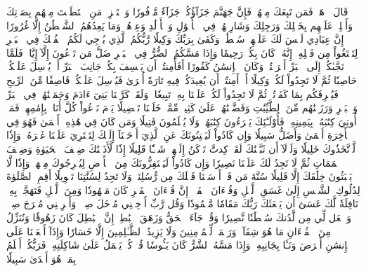 قَالَ ٱذۡهَبۡ فَمَن تَبِعَكَ مِنۡهُمۡ فَإِنَّ جَهَنَّمَ جَزَآؤُكُمۡ جَزَآءٗ مَّوۡفُورٗا
وَٱسۡتَفۡزِزۡ مَنِ ٱسۡتَطَعۡتَ مِنۡهُم بِصَوۡتِكَ وَأَجۡلِبۡ عَلَيۡهِم بِخَيۡلِكَ وَرَجِلِكَ وَشَارِكۡهُمۡ فِي ٱلۡأَمۡوَٰلِ وَٱلۡأَوۡلَٰدِ وَعِدۡهُمۡۚ وَمَا يَعِدُهُمُ ٱلشَّيۡطَٰنُ إِلَّا غُرُورًا
إِنَّ عِبَادِي لَيۡسَ لَكَ عَلَيۡهِمۡ سُلۡطَٰنٞۚ وَكَفَىٰ بِرَبِّكَ وَكِيلٗا
رَّبُّكُمُ ٱلَّذِي يُزۡجِي لَكُمُ ٱلۡفُلۡكَ فِي ٱلۡبَحۡرِ لِتَبۡتَغُواْ مِن فَضۡلِهِۦٓۚ إِنَّهُۥ كَانَ بِكُمۡ رَحِيمٗا
وَإِذَا مَسَّكُمُ ٱلضُّرُّ فِي ٱلۡبَحۡرِ ضَلَّ مَن تَدۡعُونَ إِلَّآ إِيَّاهُۖ فَلَمَّا نَجَّىٰكُمۡ إِلَى ٱلۡبَرِّ أَعۡرَضۡتُمۡۚ وَكَانَ ٱلۡإِنسَٰنُ كَفُورًا
أَفَأَمِنتُمۡ أَن يَخۡسِفَ بِكُمۡ جَانِبَ ٱلۡبَرِّ أَوۡ يُرۡسِلَ عَلَيۡكُمۡ حَاصِبٗا ثُمَّ لَا تَجِدُواْ لَكُمۡ وَكِيلًا
أَمۡ أَمِنتُمۡ أَن يُعِيدَكُمۡ فِيهِ تَارَةً أُخۡرَىٰ فَيُرۡسِلَ عَلَيۡكُمۡ قَاصِفٗا مِّنَ ٱلرِّيحِ فَيُغۡرِقَكُم بِمَا كَفَرۡتُمۡ ثُمَّ لَا تَجِدُواْ لَكُمۡ عَلَيۡنَا بِهِۦ تَبِيعٗا
۞وَلَقَدۡ كَرَّمۡنَا بَنِيٓ ءَادَمَ وَحَمَلۡنَٰهُمۡ فِي ٱلۡبَرِّ وَٱلۡبَحۡرِ وَرَزَقۡنَٰهُم مِّنَ ٱلطَّيِّبَٰتِ وَفَضَّلۡنَٰهُمۡ عَلَىٰ كَثِيرٖ مِّمَّنۡ خَلَقۡنَا تَفۡضِيلٗا
يَوۡمَ نَدۡعُواْ كُلَّ أُنَاسِۭ بِإِمَٰمِهِمۡۖ فَمَنۡ أُوتِيَ كِتَٰبَهُۥ بِيَمِينِهِۦ فَأُوْلَـٰٓئِكَ يَقۡرَءُونَ كِتَٰبَهُمۡ وَلَا يُظۡلَمُونَ فَتِيلٗا
وَمَن كَانَ فِي هَٰذِهِۦٓ أَعۡمَىٰ فَهُوَ فِي ٱلۡأٓخِرَةِ أَعۡمَىٰ وَأَضَلُّ سَبِيلٗا
وَإِن كَادُواْ لَيَفۡتِنُونَكَ عَنِ ٱلَّذِيٓ أَوۡحَيۡنَآ إِلَيۡكَ لِتَفۡتَرِيَ عَلَيۡنَا غَيۡرَهُۥۖ وَإِذٗا لَّٱتَّخَذُوكَ خَلِيلٗا
وَلَوۡلَآ أَن ثَبَّتۡنَٰكَ لَقَدۡ كِدتَّ تَرۡكَنُ إِلَيۡهِمۡ شَيۡـٔٗا قَلِيلًا
إِذٗا لَّأَذَقۡنَٰكَ ضِعۡفَ ٱلۡحَيَوٰةِ وَضِعۡفَ ٱلۡمَمَاتِ ثُمَّ لَا تَجِدُ لَكَ عَلَيۡنَا نَصِيرٗا
وَإِن كَادُواْ لَيَسۡتَفِزُّونَكَ مِنَ ٱلۡأَرۡضِ لِيُخۡرِجُوكَ مِنۡهَاۖ وَإِذٗا لَّا يَلۡبَثُونَ خِلَٰفَكَ إِلَّا قَلِيلٗا
سُنَّةَ مَن قَدۡ أَرۡسَلۡنَا قَبۡلَكَ مِن رُّسُلِنَاۖ وَلَا تَجِدُ لِسُنَّتِنَا تَحۡوِيلًا
أَقِمِ ٱلصَّلَوٰةَ لِدُلُوكِ ٱلشَّمۡسِ إِلَىٰ غَسَقِ ٱلَّيۡلِ وَقُرۡءَانَ ٱلۡفَجۡرِۖ إِنَّ قُرۡءَانَ ٱلۡفَجۡرِ كَانَ مَشۡهُودٗا
وَمِنَ ٱلَّيۡلِ فَتَهَجَّدۡ بِهِۦ نَافِلَةٗ لَّكَ عَسَىٰٓ أَن يَبۡعَثَكَ رَبُّكَ مَقَامٗا مَّحۡمُودٗا
وَقُل رَّبِّ أَدۡخِلۡنِي مُدۡخَلَ صِدۡقٖ وَأَخۡرِجۡنِي مُخۡرَجَ صِدۡقٖ وَٱجۡعَل لِّي مِن لَّدُنكَ سُلۡطَٰنٗا نَّصِيرٗا
وَقُلۡ جَآءَ ٱلۡحَقُّ وَزَهَقَ ٱلۡبَٰطِلُۚ إِنَّ ٱلۡبَٰطِلَ كَانَ زَهُوقٗا
وَنُنَزِّلُ مِنَ ٱلۡقُرۡءَانِ مَا هُوَ شِفَآءٞ وَرَحۡمَةٞ لِّلۡمُؤۡمِنِينَ وَلَا يَزِيدُ ٱلظَّـٰلِمِينَ إِلَّا خَسَارٗا
وَإِذَآ أَنۡعَمۡنَا عَلَى ٱلۡإِنسَٰنِ أَعۡرَضَ وَنَـَٔا بِجَانِبِهِۦ وَإِذَا مَسَّهُ ٱلشَّرُّ كَانَ يَـُٔوسٗا
قُلۡ كُلّٞ يَعۡمَلُ عَلَىٰ شَاكِلَتِهِۦ فَرَبُّكُمۡ أَعۡلَمُ بِمَنۡ هُوَ أَهۡدَىٰ سَبِيلٗا
